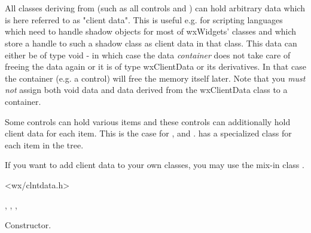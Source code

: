 \section{}\label{wxclientdata}

All classes deriving from 
(such as all controls and )
can hold arbitrary data which is here referred to as "client data".
This is useful e.g. for scripting languages which need to handle
shadow objects for most of wxWidgets' classes and which store
a handle to such a shadow class as client data in that class.
This data can either be of type void - in which case the data
{\it container} does not take care of freeing the data again
or it is of type wxClientData or its derivatives. In that case the
container (e.g. a control) will free the memory itself later.
Note that you {\it must not} assign both void data and data
derived from the wxClientData class to a container.

Some controls can hold various items and these controls can
additionally hold client data for each item. This is the case for
, 
and . 
has a specialized class 
for each item in the tree.

If you want to add client data to your own classes, you may
use the mix-in class .


<wx/clntdata.h>




, ,
, 



\label{wxclientdatawxclientdata}


Constructor.

\label{wxclientdatadtor}


